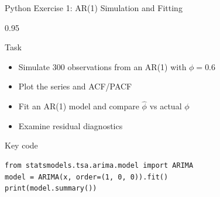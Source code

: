 \documentclass[9pt, aspectratio=169, t]{beamer}
\begin{document}
\begin{frame}[fragile]{Python Exercise 1: AR(1) Simulation and Fitting}
    \begin{cminipage}{0.95\textwidth}
    \begin{alertblock}{Task}
        \begin{itemize}\setlength{\itemsep}{0pt}
            \item Simulate 300 observations from an AR(1) with $\phi = 0.6$
            \item Plot the series and ACF/PACF
            \item Fit an AR(1) model and compare $\hat{\phi}$ vs actual $\phi$
            \item Examine residual diagnostics
        \end{itemize}
    \end{alertblock}

    \vspace{0.2cm}
    \begin{exampleblock}{Key code}
        \begin{verbatim}
from statsmodels.tsa.arima.model import ARIMA
model = ARIMA(x, order=(1, 0, 0)).fit()
print(model.summary())
        \end{verbatim}
    \end{exampleblock}
    \end{cminipage}
\end{frame}
\end{document}
